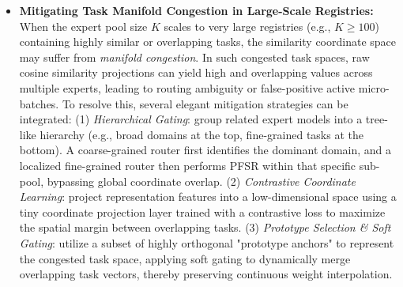 \begin{itemize}
    \item \textbf{Mitigating Task Manifold Congestion in Large-Scale Registries:} When the expert pool size $K$ scales to very large registries (e.g., $K \ge 100$) containing highly similar or overlapping tasks, the similarity coordinate space may suffer from \emph{manifold congestion}. In such congested task spaces, raw cosine similarity projections can yield high and overlapping values across multiple experts, leading to routing ambiguity or false-positive active micro-batches. To resolve this, several elegant mitigation strategies can be integrated: (1) \emph{Hierarchical Gating}: group related expert models into a tree-like hierarchy (e.g., broad domains at the top, fine-grained tasks at the bottom). A coarse-grained router first identifies the dominant domain, and a localized fine-grained router then performs PFSR within that specific sub-pool, bypassing global coordinate overlap. (2) \emph{Contrastive Coordinate Learning}: project representation features into a low-dimensional space using a tiny coordinate projection layer trained with a contrastive loss to maximize the spatial margin between overlapping tasks. (3) \emph{Prototype Selection \& Soft Gating}: utilize a subset of highly orthogonal "prototype anchors" to represent the congested task space, applying soft gating to dynamically merge overlapping task vectors, thereby preserving continuous weight interpolation.


\end{itemize}
